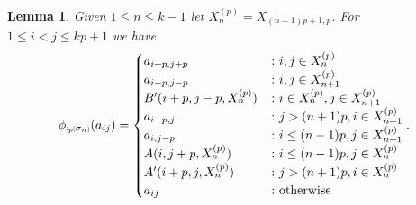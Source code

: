 \documentclass[11pt]{amsart}
\def\s{{\sigma}}
\newcommand*{\subsmallp}[1]{\scalebox{.5}{\ensuremath#1}}
\newcommand{\subpp}[2][p]{\imath_{\hspace*{-1pt}#1}\hspace*{-.5pt}\subsmallp(#2\subsmallp)}
\newtheorem{lem}[thm]{Lemma}
\theoremstyle{definition}
\begin{document}
\begin{lem}\label{Sigma_n}
Given $1\le n\le k-1$ let $X_n^{(p)} = X_{(n-1)p+1,p}$. For $1\le i< j\le kp+1$ we have
$$
\phi_{\subpp{\s_n}}(a_{ij}) =
\begin{cases}
       a_{i+p,j+p} &\colon i,j\in X_n^{(p)}\\
       a_{i-p,j-p} & \colon i,j\in X_{n+1}^{(p)}\\
       B'(i+p,j-p,X_n^{(p)}) & \colon i\in X_n^{(p)}, j\in X_{n+1}^{(p)}\\
       a_{i-p,j} &\colon j > (n+1)p, i\in X_{n+1}^{(p)}\\
       a_{i,j-p} & \colon i\le(n-1)p, j\in X_{n+1}^{(p)}\\
       A(i,j+p,X_n^{(p)}) & \colon i\le(n-1)p, j\in X_n^{(p)}\\
       A'(i+p,j,X_n^{(p)}) & \colon j> (n+1)p, i\in X_n^{(p)}\\
       a_{ij} & \colon \textnormal{otherwise}
\end{cases}.
$$
\end{lem}



\end{document}
